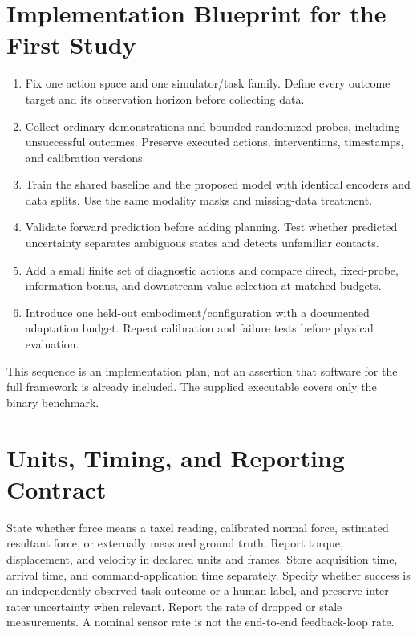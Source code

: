 \documentclass[11pt]{article}
\begin{document}
\appendix
\section{Implementation Blueprint for the First Study}
\begin{enumerate}
\item Fix one action space and one simulator/task family. Define every outcome target and its observation horizon before collecting data.
\item Collect ordinary demonstrations and bounded randomized probes, including unsuccessful outcomes. Preserve executed actions, interventions, timestamps, and calibration versions.
\item Train the shared baseline and the proposed model with identical encoders and data splits. Use the same modality masks and missing-data treatment.
\item Validate forward prediction before adding planning. Test whether predicted uncertainty separates ambiguous states and detects unfamiliar contacts.
\item Add a small finite set of diagnostic actions and compare direct, fixed-probe, information-bonus, and downstream-value selection at matched budgets.
\item Introduce one held-out embodiment/configuration with a documented adaptation budget. Repeat calibration and failure tests before physical evaluation.
\end{enumerate}
This sequence is an implementation plan, not an assertion that software for the full framework is already included. The supplied executable covers only the binary benchmark.

\section{Units, Timing, and Reporting Contract}
State whether force means a taxel reading, calibrated normal force, estimated resultant force, or externally measured ground truth. Report torque, displacement, and velocity in declared units and frames. Store acquisition time, arrival time, and command-application time separately. Specify whether success is an independently observed task outcome or a human label, and preserve inter-rater uncertainty when relevant. Report the rate of dropped or stale measurements. A nominal sensor rate is not the end-to-end feedback-loop rate.
\end{document}
